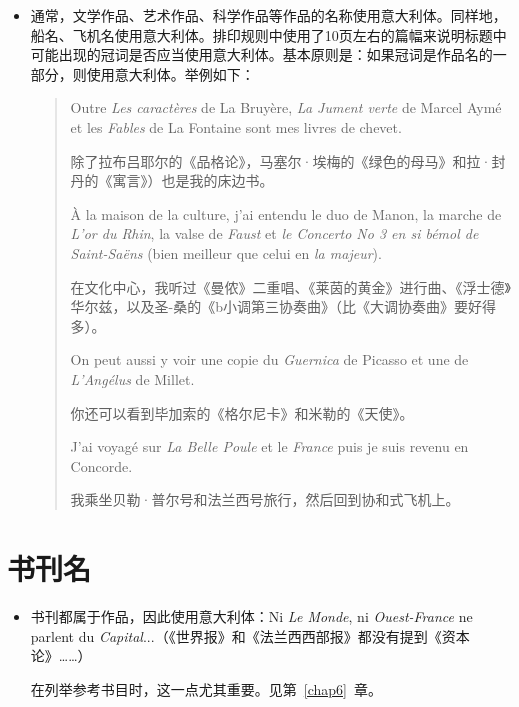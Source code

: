 \begin{itemize}
    \item 通常，文学作品、艺术作品、科学作品等作品的名称使用意大利体。同样地，船名、飞机名使用意大利体。排印规则中使用了10页左右的篇幅来说明标题中可能出现的冠词是否应当使用意大利体。基本原则是：如果冠词是作品名的一部分，则使用意大利体。举例如下：
    
    \begin{quote}
        Outre \emph{Les caractères} de La Bruyère, \emph{La Jument verte} de Marcel Aymé et les \emph{Fables} de La Fontaine sont mes livres de chevet.

        \begin{bil}
            除了拉布吕耶尔的《品格论》，马塞尔·埃梅的《绿色的母马》和拉·封丹的《寓言》）也是我的床边书。
        \end{bil}

        À la maison de la culture, j'ai entendu le duo de Manon, la marche de \emph{L'or du Rhin}, la valse de \emph{Faust} et \emph{le Concerto No 3 en si bémol de Saint-Saëns} (bien meilleur que celui en \emph{la majeur}).

        \begin{bil}
            在文化中心，我听过《曼侬》二重唱、《莱茵的黄金》进行曲、《浮士德》华尔兹，以及圣-桑的《b小调第三协奏曲》（比《大调协奏曲》要好得多）。
        \end{bil}

        On peut aussi y voir une copie du \emph{Guernica} de Picasso et une de \emph{L'Angélus} de Millet.

        \begin{bil}
            你还可以看到毕加索的《格尔尼卡》和米勒的《天使》。
        \end{bil}

        J'ai voyagé sur \emph{La Belle Poule} et le \emph{France} puis je suis revenu en Concorde.

        \begin{bil}
            我乘坐贝勒·普尔号和法兰西号旅行，然后回到协和式飞机上。
        \end{bil}
    \end{quote}
\end{itemize}

\section{书刊名}

\begin{itemize}
    \item 书刊都属于作品，因此使用意大利体：Ni \emph{Le Monde}, ni \emph{Ouest-France }ne parlent du \emph{Capital}...（《世界报》和《法兰西西部报》都没有提到《资本论》……）
    
    在列举参考书目时，这一点尤其重要。见第~\ref{chap6}~章。
\end{itemize}

